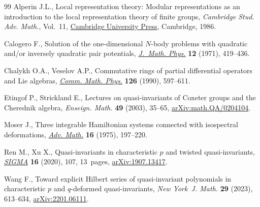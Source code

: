 \documentclass[11pt]{article}
\numberwithin{equation}{section}
\theoremstyle{definition}
\numberwithin{equation}{section}
\begin{document}
\endgroup
\begin{thebibliography}{99}
Alperin J.L., Local representation theory: {M}odular representations as an
 introduction to the local representation theory of finite groups,
 \textit{Cambridge Stud. Adv. Math.}, Vol.~11,
 \href{https://doi.org/10.1017/CBO9780511623592}{Cambridge University Press},
 Cambridge, 1986.

Calogero F., Solution of the one-dimensional {$N$}-body problems with quadratic
 and/or inversely quadratic pair potentials,
 \href{https://doi.org/10.1063/1.1665604}{\textit{J.~Math. Phys.}} \textbf{12}
 (1971), 419--436.

Chalykh O.A., Veselov A.P., Commutative rings of partial differential operators
 and {L}ie algebras, \href{https://doi.org/10.1007/BF02125702}{\textit{Comm.
 Math. Phys.}} \textbf{126} (1990), 597--611.

Etingof P., Strickland E., Lectures on quasi-invariants of {C}oxeter groups and
 the {C}herednik algebra, \textit{Enseign. Math.} \textbf{49} (2003), 35--65,
 \href{http://arxiv.org/abs/math.QA/0204104}{arXiv:math.QA/0204104}.

Moser J., Three integrable {H}amiltonian systems connected with isospectral
 deformations,
 \href{https://doi.org/10.1016/0001-8708(75)90151-6}{\textit{Adv. Math.}}
 \textbf{16} (1975), 197--220.

Ren M., Xu X., Quasi-invariants in characteristic {$p$} and twisted
 quasi-invariants,
 \href{https://doi.org/10.3842/SIGMA.2020.107}{\textit{SIGMA}} \textbf{16}
 (2020), 107, 13~pages,
 \href{http://arxiv.org/abs/1907.13417}{arXiv:1907.13417}.

Wang F., Toward explicit {H}ilbert series of quasi-invariant polynomials in
 characteristic {$p$} and {$q$}-deformed quasi-invariants, \textit{New York~J.
 Math.} \textbf{29} (2023), 613--634,
 \href{http://arxiv.org/abs/2201.06111}{arXiv:2201.06111}.

\end{thebibliography}
\end{document}
